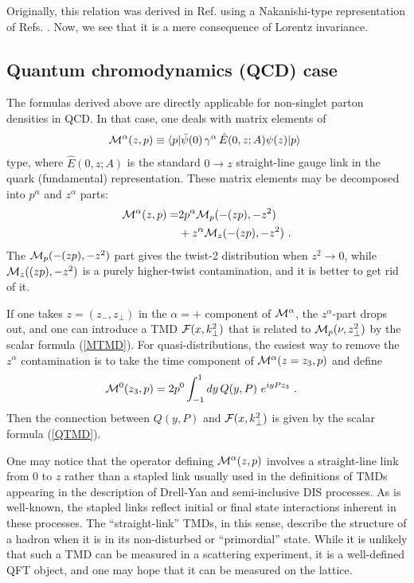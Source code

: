 Originally, this relation was derived in Ref. \cite{Radyushkin:2016hsy} using
a Nakanishi-type representation of Refs. \cite{Radyushkin:2014vla,Radyushkin:2015gpa}.
Now, we see that it is a mere consequence of Lorentz invariance.

\subsection{Quantum chromodynamics (QCD) case}

The formulas derived above are
directly applicable for non-singlet parton densities in QCD.
In that case, one deals with matrix elements of
\begin{align}
{\cal M}^\alpha  (z,p) \equiv \langle  p |  \bar \psi (0) \,
\gamma^\alpha \,  { \hat E} (0,z; A) \psi (z) | p \rangle \
\label{Malpha}
\end{align}
type, where $
{ \hat E}(0,z; A)$ is the standard $0\to z$ straight-line gauge link
in the quark (fundamental) representation.
These matrix elements may be decomposed into $p^\alpha$ and $z^\alpha$ parts:
\begin{align}
{\cal M}^\alpha  (z,p) = &2 p^\alpha  {\cal M}_p (-(zp), -z^2)
\nonumber \\  & + z^\alpha  {\cal M}_z (-(zp),-z^2)
\ .
\end{align}
The ${\cal M}_p (-(zp), -z^2) $ part gives the twist-2 distribution when $z^2 \to 0$,
while $ {\cal M}_z ((zp),-z^2)$ is a purely higher-twist contamination,
and it is better to get rid of it.

If one takes $z=(z_-, z_\perp)$ in the $\alpha=+$ component of
${\cal M}^\alpha$, the $z^\alpha$-part drops out,
and one can introduce a TMD ${\cal F}(x, k_\perp^2)$ that
is related to $ {\cal M}_p (\nu, z_\perp^2)$ by the scalar formula
(\ref{MTMD}).
For quasi-distributions,
the easiest way to remove the $z^\alpha$ contamination is to take the
time component of \mbox{$ {\cal M}^\alpha  (z=z_3,p)$} and define
\begin{align}
&  {\cal M}^0   (z_3,p)
=  2p^0
\int_{-1}^1 dy\,
Q(y,P) \,
\,  e^{i  y Pz_3 }  \  .
\label{OPhixspin12}
\end{align}
Then the connection between $Q(y,P)$ and
${\cal F}(x, k_\perp^2)$ is given
by the scalar formula (\ref{QTMD}).

One may notice that the operator defining $ {\cal M}^\alpha  (z,p) $
involves a straight-line link from $0$ to $z$ rather than a
stapled link usually used in the definitions of TMDs appearing in the description of
Drell-Yan and semi-inclusive DIS processes. As is well-known, the stapled links
reflect initial or final state interactions inherent in these processes.
The ``straight-link'' TMDs, in this sense, describe the structure
of a hadron when it is in
its non-disturbed or ``primordial'' state. While it is unlikely that such a TMD can be measured
in a scattering experiment, it is a well-defined QFT object,
and one may hope that it can be measured on the lattice.


